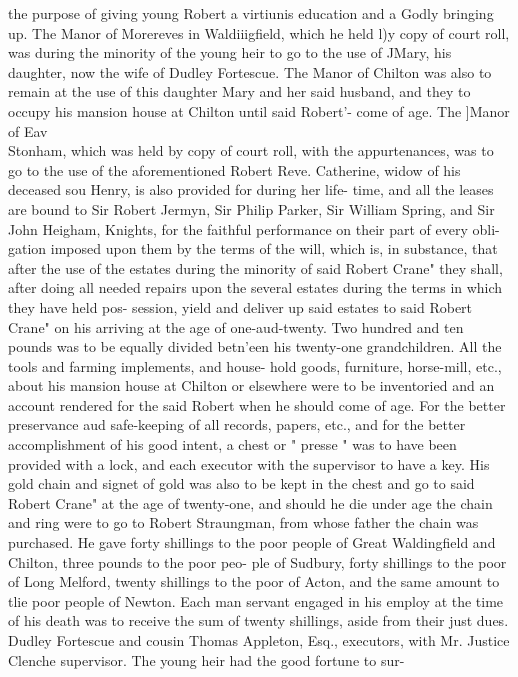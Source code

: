 \documentclass[oneside]{book}
\begin{document}
the purpose of giving young Robert a virtiunis education and a 
Godly bringing up. The Manor of Morereves in Waldiiigfield, 
which he held l)y copy of court roll, was during the minority of 
the young heir to go to the use of JMary, his daughter, now the 
wife of Dudley Fortescue. The Manor of Chilton was also to 
remain at the use of this daughter Mary and her said husband, 
and they to occupy his mansion house at Chilton until said 
Robert'- come of age. The ]Manor of Eav\\ Stonham, which 
was held by copy of court roll, with the appurtenances, was to go 
to the use of the aforementioned Robert Reve. Catherine, widow 
of his deceased sou Henry, is also provided for during her life- 
time, and all the leases are bound to Sir Robert Jermyn, Sir 
Philip Parker, Sir William Spring, and Sir John Heigham, 
Knights, for the faithful performance on their part of every obli- 
gation imposed upon them by the terms of the will, which is, in 
substance, that after the use of the estates during the minority of 
said Robert Crane" they shall, after doing all needed repairs upon 
the several estates during the terms in which they have held pos- 
session, yield and deliver up said estates to said Robert Crane" 
on his arriving at the age of one-aud-twenty. Two hundred and 
ten pounds was to be equally divided betn'een his twenty-one 
grandchildren. All the tools and farming implements, and house- 
hold goods, furniture, horse-mill, etc., about his mansion house 
at Chilton or elsewhere were to be inventoried and an account 
rendered for the said Robert when he should come of age. For 
the better preservance aud safe-keeping of all records, papers, etc., 
and for the better accomplishment of his good intent, a chest or 
" presse " was to have been provided with a lock, and each executor 
with the supervisor to have a key. His gold chain and signet of 
gold was also to be kept in the chest and go to said Robert Crane" 
at the age of twenty-one, and should he die under age the chain 
and ring were to go to Robert Straungman, from whose father the 
chain was purchased. He gave forty shillings to the poor people 
of Great Waldingfield and Chilton, three pounds to the poor peo- 
ple of Sudbury, forty shillings to the poor of Long Melford, 
twenty shillings to the poor of Acton, and the same amount to 
tlie poor people of Newton. Each man servant engaged in his 
employ at the time of his death was to receive the sum of twenty 
shillings, aside from their just dues. Dudley Fortescue and 
cousin Thomas Appleton, Esq., executors, with Mr. Justice 
Clenche supervisor. The young heir had the good fortune to sur- 
\end{document}
